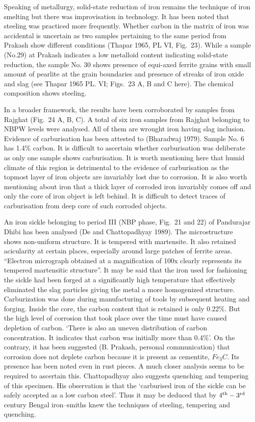 Speaking of metallurgy, solid-state reduction of iron remains the technique of iron smelting but there was improvisation in technology. It has been noted that steeling was practiced more frequently. Whether carbon in the matrix of iron was accidental is uncertain as two samples pertaining to the same period from Prakash show different conditions (Thapar 1965, PL VI, Fig.~23). While a sample (No.29) at Prakash indicates a low metalloid content indicating solid-state reduction, the sample No. 30 shows presence of equi-axed ferrite grains with small amount of pearlite at the grain boundaries and presence of streaks of iron oxide and slag (see Thapar 1965 PL. VI; Figs.~23 A, B and C here). The chemical composition shows steeling.

In a broader framework, the results have been corroborated by samples from Rajghat (Fig.~24 A, B, C). A total of six iron samples from Rajghat belonging to NBPW levels were analysed. All of them are wrought iron having slag inclusion. Evidence of carburisation has been attested to (Bharadwaj 1979). Sample No. 6 has 1.4\% carbon. It is difficult to ascertain whether carburisation was deliberate as only one sample shows carburisation. It is worth mentioning here that humid climate of this region is detrimental to the evidence of carburisation as the topmost layer of iron objects are invariably lost due to corrosion. It is also worth mentioning about iron that a thick layer of corroded iron invariably comes off and only the core of iron object is left behind. It is difficult to detect traces of carburisation from deep core of such corroded objects.

An iron sickle belonging to period III (NBP phase, Fig.~21 and 22) of Pandurajar Dhibi has been analysed (De and Chattopadhyay 1989). The microstructure shows non-uniform structure. It is tempered with martensite. It also retained acicularity at certain places, especially around large patches of ferrite areas. “Electron micrograph obtained at a magnification of 100x clearly represents its tempered martensitic structure”. It may be said that the iron used for fashioning the sickle had been forged at a significantly high temperature that effectively eliminated the slag particles giving the metal a more homogenized structure. Carburization was done during manufacturing of tools by subsequent heating and forging. Inside the core, the carbon content that is retained is only 0.22\%. But the high level of corrosion that took place over the time must have caused depletion of carbon. ‘There is also an uneven distribution of carbon concentration. It indicates that carbon was initially more than 0.4\%’. On the contrary, it has been suggested (B. Prakash, personal communication) that corrosion does not deplete carbon because it is present as cementite, $Fe_3C$. Its presence has been noted even in rust pieces. A much closer analysis seems to be required to ascertain this. Chattopadhyay also suggests quenching and tempering of this specimen. His observation is that the ‘carburised iron of the sickle can be safely accepted as a low carbon steel’. Thus it may be deduced that by $4^{\rm th}-3^{\rm rd}$ century Bengal iron–smiths knew the techniques of steeling, tempering and quenching.


